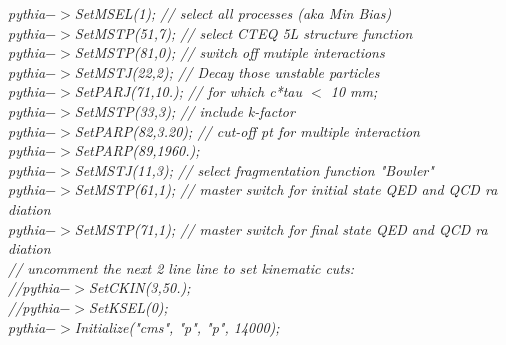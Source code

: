 \documentclass{cmspaper}
\begin{document}
{\small \it
pythia$->$SetMSEL(1);         // select all processes (aka Min Bias)\\
pythia$->$SetMSTP(51,7);      // select CTEQ 5L structure function\\
pythia$->$SetMSTP(81,0);      // switch off mutiple interactions\\
pythia$->$SetMSTJ(22,2);      // Decay those unstable particles\\
pythia$->$SetPARJ(71,10.);    // for which c*tau $<$ 10 mm;\\
pythia$->$SetMSTP(33,3);      // include k-factor\\
pythia$->$SetPARP(82,3.20);   // cut-off pt for multiple interaction\\
pythia$->$SetPARP(89,1960.);\\
pythia$->$SetMSTJ(11,3);      // select fragmentation function "Bowler"\\
pythia$->$SetMSTP(61,1);      // master switch for initial state QED and QCD ra
diation\\
pythia$->$SetMSTP(71,1);      // master switch for final   state QED and QCD ra
diation\\
// uncomment the next 2 line line to set kinematic cuts:\\
//pythia$->$SetCKIN(3,50.);\\
//pythia$->$SetKSEL(0);\\
pythia$->$Initialize("cms", "p", "p", 14000);\\
} 
\end{document}
